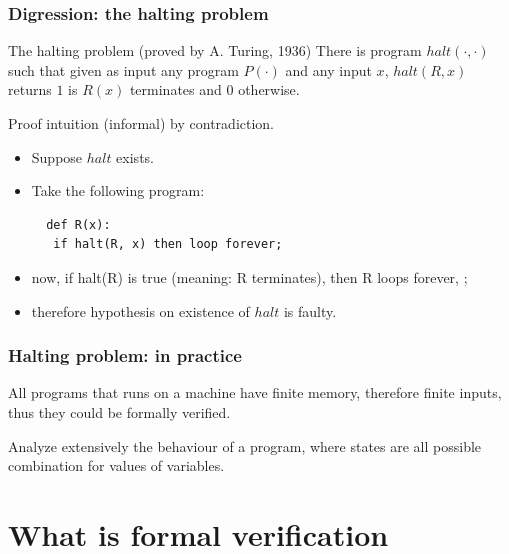 \documentclass[usenames,dvipsnames]{beamer}
\begin{document}

\begin{frame}[fragile]
  \frametitle{Digression: the halting problem}
  
  \begin{alertblock}{The halting problem (proved by A. Turing, 1936)}
  	There is  program $halt(\cdot, \cdot)$ such that given as input any program $P(\cdot)$ and any input $x$, $halt(R, x)$ returns $1$ is $R(x)$ terminates and $0$ otherwise.
  \end{alertblock}
  
  \vfill \pause
  
Proof intuition (informal) by contradiction.
 \begin{itemize}
  \item Suppose $halt$ exists.
  \item Take the following program:
 \begin{verbatim}
  def R(x):
   if halt(R, x) then loop forever;
 \end{verbatim}
\pause \item now, if halt(R) is true (meaning: R terminates), then R loops forever, ;
\item therefore hypothesis on existence of $halt$ is faulty.
\end{itemize}
\end{frame}

\begin{frame}
  \frametitle{Halting problem: in practice}
  
  \centering
  All programs that runs on a machine have finite memory, therefore finite inputs, thus  they could be formally verified.
  
  \pause \vfill
  
  Analyze extensively the behaviour of a program, where states are all possible combination for values of variables.
  
\end{frame}


\section{What is formal verification}
\end{document}
